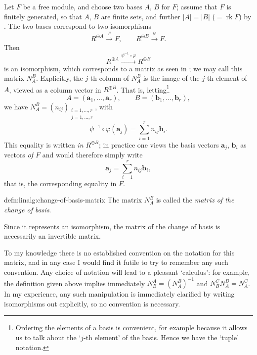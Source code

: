 Let $F$ be a free module, and choose two bases $A$, $B$ for $F$;
assume that $F$ is finitely generated, so that $A$, $B$ are finite
sets, and further $|A| = |B|$ ($= \operatorname{rk} F$) by
. The two bases correspond to two isomorphisms
\[
  R^{\oplus A} \xrightarrow{\varphi} F, \qquad R^{\oplus B}
  \xrightarrow{\psi} F.
\]
Then
\[
  R^{\oplus A} \xrightarrow{\psi^{-1} \circ \varphi} R^{\oplus B}
\]
is an isomorphism, which corresponds to a matrix as seen in
; we may call this matrix $N_A^B$. Explicitly, the
$j$-th column of $N_A^B$ is the image of the $j$-th element of $A$,
viewed as a column vector in $R^{\oplus B}$. That is,
letting\footnote{Ordering the elements of a basis is convenient, for
  example because it allows us to talk about the `$j$-th element' of
  the basis. Hence we have the `tuple' notation.}
\[
  A = (\mathbf{a}_1, \dots, \mathbf{a}_r), \qquad B = (\mathbf{b}_1,
  \dots, \mathbf{b}_r),
\]
we have $N_A^B = (n_{ij})_{\substack{i=1,\dots,r \\ j=1,\dots,r}}$,
with
\[
  \psi^{-1} \circ \varphi(\mathbf{a}_j) = \sum_{i=1}^r n_{ij}
  \mathbf{b}_i.
\]
This equality is written \emph{in $R^{\oplus B}$}; in practice one
views the basis vectors $\mathbf{a}_j$, $\mathbf{b}_i$ as vectors
\emph{of $F$} and would therefore simply write
\[
  \mathbf{a}_j = \sum_{i=1}^r n_{ij} \mathbf{b}_i,
\]
that is, the corresponding equality in $F$.

\begin{defn}{}{defn:linalg:change-of-basis-matrix}
  The matrix $N_A^B$ is called the \emph{matrix of the change of
    basis}.
\end{defn}

Since it represents an isomorphism, the matrix of the change of basis
is necessarily an invertible matrix.

To my knowledge there is no established convention on the notation for
this matrix, and in any case I would find it futile to try to remember
any such convention. Any choice of notation will lead to a pleasant
`calculus': for example, the definition given above implies
immediately $N_B^A = (N_A^B)^{-1}$ and $N_B^C N_A^B = N_A^C$. In my
experience, any such manipulation is immediately clarified by writing
isomorphisms out explicitly, so no convention is necessary.

